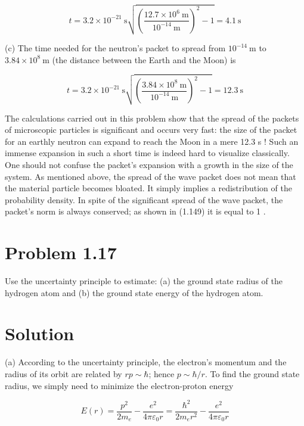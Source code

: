 \documentclass[10pt]{article}
\begin{document}
\begin{equation*}
t=3.2 \times 10^{-21} \mathrm{~s} \sqrt{\left(\frac{12.7 \times 10^{6} \mathrm{~m}}{10^{-14} \mathrm{~m}}\right)^{2}-1}=4.1 \mathrm{~s} \tag{1.234}
\end{equation*}


(c) The time needed for the neutron's packet to spread from $10^{-14} \mathrm{~m}$ to $3.84 \times 10^{8} \mathrm{~m}$ (the distance between the Earth and the Moon) is


\begin{equation*}
t=3.2 \times 10^{-21} \mathrm{~s} \sqrt{\left(\frac{3.84 \times 10^{8} \mathrm{~m}}{10^{-14} \mathrm{~m}}\right)^{2}-1}=12.3 \mathrm{~s} \tag{1.235}
\end{equation*}


The calculations carried out in this problem show that the spread of the packets of microscopic particles is significant and occurs very fast: the size of the packet for an earthly neutron can expand to reach the Moon in a mere 12.3 s ! Such an immense expansion in such a short time is indeed hard to visualize classically. One should not confuse the packet's expansion with a growth in the size of the system. As mentioned above, the spread of the wave packet does not mean that the material particle becomes bloated. It simply implies a redistribution of the probability density. In spite of the significant spread of the wave packet, the packet's norm is always conserved; as shown in (1.149) it is equal to 1 .

\section*{Problem 1.17}
Use the uncertainty principle to estimate: (a) the ground state radius of the hydrogen atom and (b) the ground state energy of the hydrogen atom.

\section*{Solution}
(a) According to the uncertainty principle, the electron's momentum and the radius of its orbit are related by $r p \sim \hbar$; hence $p \sim \hbar / r$. To find the ground state radius, we simply need to minimize the electron-proton energy


\begin{equation*}
E(r)=\frac{p^{2}}{2 m_{e}}-\frac{e^{2}}{4 \pi \varepsilon_{0} r}=\frac{\hbar^{2}}{2 m_{e} r^{2}}-\frac{e^{2}}{4 \pi \varepsilon_{0} r} \tag{1.236}
\end{equation*}
\end{document}
